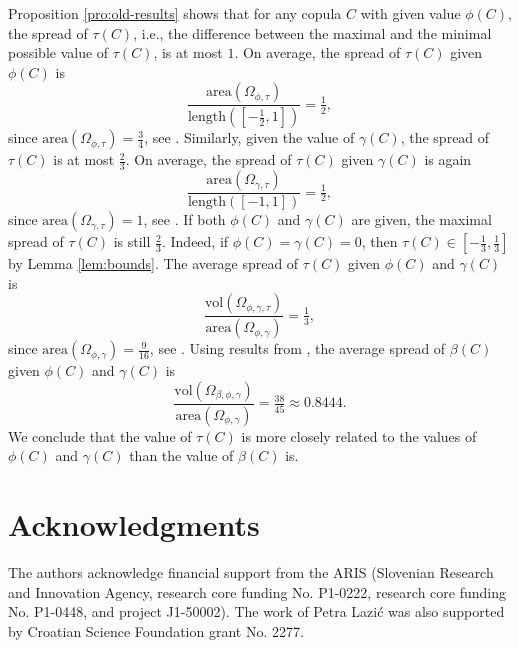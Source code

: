\documentclass[12pt,a4paper]{amsart}
\theoremstyle{definition}
\begin{document}
Proposition \ref{pro:old-results} shows that for any copula $C$ with given value $\phi(C)$, the spread of $\tau(C)$, i.e., the difference between the maximal and the minimal possible value of $\tau(C)$, is at most $1$. On average, the spread of $\tau(C)$ given $\phi(C)$ is
$$\frac{\text{area}(\Omega_{\phi,\tau})}{\text{length}([-\frac12,1])}=\tfrac12,$$
since $\text{area}(\Omega_{\phi,\tau})=\frac34$, see \cite{KoBuSt}.
Similarly, given the value of $\gamma(C)$, the spread of $\tau(C)$ is at most $\frac23$. On average, the spread of $\tau(C)$ given $\gamma(C)$ is again
$$\frac{\text{area}(\Omega_{\gamma,\tau})}{\text{length}([-1,1])}=\tfrac12,$$
since $\text{area}(\Omega_{\gamma,\tau})=1$, see \cite{KoBuSt}.
If both $\phi(C)$ and $\gamma(C)$ are given, the maximal spread of $\tau(C)$ is still $\frac23$. Indeed, if $\phi(C)=\gamma(C)=0$, then $\tau(C)\in [-\frac13,\frac13]$ by Lemma \ref{lem:bounds}. The average spread of $\tau(C)$ given $\phi(C)$ and $\gamma(C)$ is
$$\frac{\mathrm{vol}({\Omega_{\phi, \gamma, \tau} })}{\text{area}(\Omega_{\phi,\gamma})}= \tfrac13,$$
since $\text{area}(\Omega_{\phi,\gamma})=\frac{9}{16}$, see \cite{KoBuMo}.
Using results from \cite{KoBuMo26}, the average spread of $\beta(C)$ given $\phi(C)$ and $\gamma(C)$ is
$$\frac{\mathrm{vol}({\Omega_{\beta,\phi, \gamma} })}{\text{area}(\Omega_{\phi,\gamma})}= \tfrac{38}{45}\approx 0.8444.$$
We conclude that the value of $\tau(C)$ is more closely related to the values of $\phi(C)$ and $\gamma(C)$ than the value of $\beta(C)$ is.


\section*{Acknowledgments}

The authors acknowledge financial support from the ARIS (Slovenian Research and Innovation Agency, research core funding No. P1-0222, research core funding No. P1-0448, and project J1-50002). The work of Petra Lazić was also supported by Croatian Science Foundation grant No. 2277.






\end{document}
